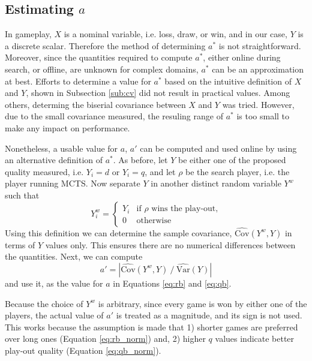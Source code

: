 \documentclass{ecai2014}
\newcommand{\SVar}[1]{\mathrm{\widehat{Var}}\left( #1 \right)}
\newcommand{\SCov}[1]{\mathrm{\widehat{Cov}}\left( #1 \right)}
\begin{document}
\subsection{Estimating $a$}
\label{subsec:astar}
In gameplay, $X$ is a nominal variable, i.e. loss, draw, or win, and in our case, $Y$ is a discrete scalar. Therefore the method of determining $a^*$ is not straightforward. Moreover, since the quantities required to compute $a^*$, either online during search, or offline, are unknown for complex domains, $a^*$ can be an approximation at best. 
Efforts to determine a value for $a^*$ based on the intuitive definition of $X$ and $Y$, shown in Subsection \ref{sub:cv} did not result in practical values. Among others, determing the biserial covariance between $X$ and $Y$ was tried. However, due to the small covariance measured, the resuling range of $a^*$ is too small to make any impact on performance.

Nonetheless, a usable value for $a$, $a'$ can be computed and used online by using an alternative definition of $a^*$. As before, let $Y$ be either one of the proposed quality measured, i.e. $Y_i=d$ or $Y_i=q$, and let $\rho$ be the search player, i.e. the player running MCTS. Now separate $Y$ in another distinct random variable $Y^w$ such that
\begin{equation}
Y^w_i =
\begin{cases}
   Y_i & \text{if $\rho$ wins the play-out,} \\
   0   & \text{otherwise}
\end{cases}
\label{eq:ywin}
\end{equation}
Using this definition we can determine the sample covariance, $\SCov{Y^w,Y}$ in terms of $Y$ values only. This ensures there are no numerical differences between the quantities. Next, we can compute 
\begin{equation}
	a'=\left|{\SCov{Y^w,Y}}\mathbin{/}{\SVar{Y}}\right|
\end{equation}
and use it, as the value for $a$ in Equations \ref{eq:rb} and \ref{eq:qb}. 

Because the choice of $Y^w$ is arbitrary, since every game is won by either one of the players, the actual value of $a'$ is treated as a magnitude, and its sign is not used. This works because the assumption is made that 1) shorter games are preferred over long ones (Equation \ref{eq:rb_norm}) and, 2) higher $q$ values indicate better play-out quality (Equation \ref{eq:qb_norm}).

\end{document}
